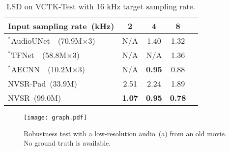 \documentclass[a4paper]{article}
\begin{document}
\begin{table}[tbp]
\centering
\caption{LSD on VCTK-Test with 16 kHz target sampling rate.}
\label{tab:16k}
\begin{tabular}{@{}lcccc@{}}
\toprule
          Input sampling rate~(kHz)                     & 2   & 4  & 8   \\ \midrule
{ $^{*}$AudioUNet~\cite{audio-supre-resolution-SR-kuleshov2017audio}~(70.9M$\times 3$)} & N/A  & 1.40 &  1.32  \\
{ $^{*}$TFNet~\cite{tf-network-sr-lim2018time}~(58.8M$\times 3$)}    & N/A & N/A   & 1.36   \\
{ $^{*}$AECNN~\cite{heming-towards-sr-wang2021towards}~(10.2M$\times 3$)}    & N/A  & \textbf{0.95} & 0.88   \\
{NVSR-Pad~(33.9M)}                             &  2.51 & 2.24 & 1.89    \\
{NVSR~(99.0M)}                             &  \textbf{1.07} & \textbf{0.95} & \textbf{0.78}   \\ \bottomrule
\end{tabular}
\vspace{-0.6em}
\end{table}

\begin{figure*}[tbp] \centering
\texttt{[image: graph.pdf]}
  \caption{Robustness test with a low-resolution audio~(a) from an old movie\protect\footnotemark. No ground truth is available. }
  \label{fig-tiedaoyoujidui}
\end{figure*}
\end{document}
